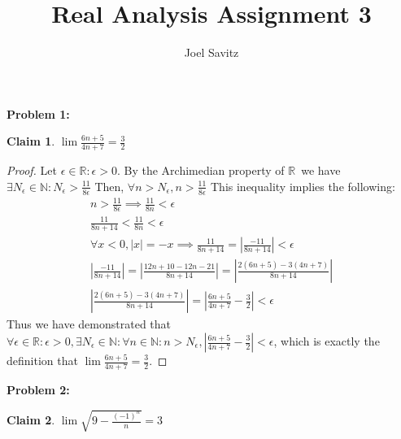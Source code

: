 \documentclass{article}
\title{Real Analysis Assignment 3}
\author{Joel Savitz}
\newcommand{\reals}{\ensuremath{\mathbb{R}}}
\newcommand{\nats}{\ensuremath{\mathbb{N}}}
\newcommand{\eps}{\ensuremath{\epsilon}}
\newcommand{\neps}{\ensuremath{N_\epsilon}}
\newtheorem{clm}{Claim}
\begin{document}
\maketitle

\textbf{Problem 1:}

\begin{clm} \label{c1}
	$\lim \frac{6n+5}{4n+7} = \frac{3}{2}$
\end{clm}

\begin{proof}
	Let $\eps \in \reals : \eps > 0$.
	By the Archimedian property of \reals\,
	we have $\exists N_\eps \in \nats: N_\eps > \frac{11}{8\eps}$
	Then, $\forall n > N_\eps, n > \frac{11}{8\eps}$
	This inequality implies the following: 
	\begin{align}
		n > \frac{11}{8\eps} \implies \frac{11}{8n} < \eps \\
		\frac{11}{8n+14} < \frac{11}{8n} < \eps \\
		\forall x < 0, |x| = -x \implies \frac{11}{8n+14} = |\frac{-11}{8n+14}| < \eps \\
	|\frac{-11}{8n+14}| = |\frac{12n + 10 - 12n - 21}{8n+14}| = |\frac{2(6n+5) - 3(4n+7)}{8n+14}| \\
	|\frac{2(6n+5) - 3(4n+7)}{8n+14}| = |\frac{6n+5}{4n+7} - \frac{3}{2}| < \eps
	\end{align}
	Thus we have demonstrated that $\forall \eps \in \reals : \eps > 0, \exists \neps \in \nats:
	\forall n \in \nats: n > \neps, |\frac{6n+5}{4n+7} - \frac{3}{2}| < \eps$,
	which is exactly the definition that
	$\lim \frac{6n+5}{4n+7} = \frac{3}{2}$.
\end{proof}

\textbf{Problem 2:}

\begin{clm} \label{c2}
	$\lim \sqrt{9-\frac{(-1)^n}{n}} = 3$
\end{clm}
\end{document}
